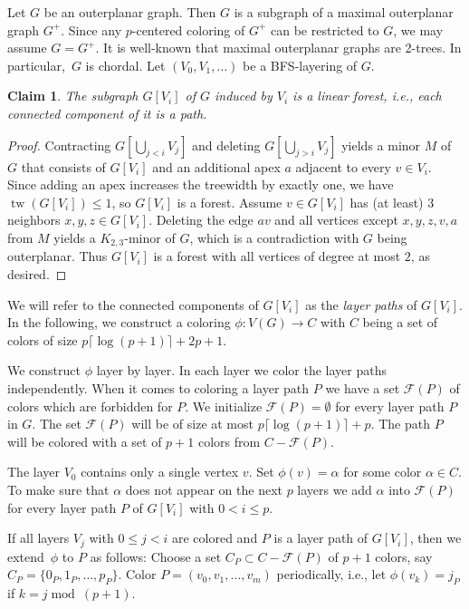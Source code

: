 \documentclass[11pt]{article}
\newtheorem*{klaim}{Claim}
\begin{document}
  Let $G$ be an outerplanar graph. Then $G$ is a subgraph of a
  maximal outerplanar graph $G^+$. Since any $p$-centered coloring of
  $G^+$ can be restricted to $G$, we may assume $G=G^+$. It is
  well-known that maximal outerplanar graphs are 2-trees. 
  In particular,~$G$ is chordal. Let $(V_0,V_1,\ldots)$ be a BFS-layering
  of $G$.
\begin{klaim}
  The subgraph $G[V_i]$ of $G$ induced by $V_i$ is a linear forest,
  i.e., each connected component of it is a path.
\end{klaim}
\begin{proof}
  Contracting $G[\bigcup_{j< i} V_j]$ and deleting
  $G[\bigcup_{j> i} V_j]$ yields a minor $M$ of $G$ that consists of
  $G[V_i]$ and an additional apex $a$ adjacent to every $v\in V_i$. 
  Since adding an apex increases
  the treewidth by exactly one, we have $\operatorname{tw}(G[V_i])\leq 1$, so $G[V_i]$ is a
  forest. Assume $v\in G[V_i]$ has (at least) 3 neighbors
  $x,y,z\in G[V_i]$. Deleting the edge $av$ and all vertices except
  $x,y,z,v,a$ from $M$ yields a $K_{2,3}$-minor of $G$, 
  which is a contradiction with $G$ being outerplanar.
  Thus $G[V_i]$ is a forest with all vertices of degree at most $2$, 
  as desired.
\end{proof}

We will refer to the connected components of $G[V_i]$ as the
\emph{layer paths} of $G[V_i]$.
In the following, we construct a coloring
$\phi:V(G) \rightarrow C$ with $C$ being a set of colors 
of size $p\lceil\log(p+1)\rceil + 2p+1$.

We construct $\phi$ layer by layer. 
In each layer we color the layer paths independently. When it comes
to coloring a layer path $P$ we have a set $\mathcal{F}(P)$ of colors which
are forbidden for $P$.
We initialize $\mathcal{F}(P)=\emptyset$ for every layer path $P$ in $G$.
The set $\mathcal{F}(P)$ will be of size at most $p\lceil\log (p+1)\rceil+p$.
The path $P$ will be colored with a set of $p+1$ colors from $C-\mathcal{F}(P)$.

The layer $V_0$ contains only a single vertex $v$. 
Set $\phi(v)=\alpha$ for some color $\alpha\in C$. 
To make
sure that $\alpha$ does not appear on the next $p$ layers we add $\alpha$ 
into $\mathcal{F}(P)$ for every layer path $P$ of $G[V_i]$ with
$0 < i \leq p$.

If all layers $V_j$ with $0\leq j <i$ are colored and $P$ is a layer path 
of $G[V_i]$, then we extend~$\phi$ to $P$ as follows: 
Choose a set $C_P \subset C-\mathcal{F}(P)$ of $p+1$ colors, say 
$C_P =\{0_P,1_P,\ldots,p_P\}$.  
Color $P=(v_0,v_1,\ldots,v_m)$ periodically, i.e., let
$\phi(v_k)=j_P$ if $k=j \operatorname{mod}\ (p+1)$.  
\end{document}
